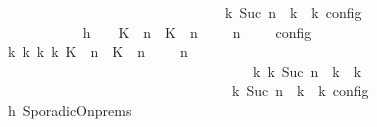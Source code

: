 \begin{isabellebody}
\ \ \ \ \ \ \ \ \ \ \ \ \ \ \ \ \ \ \ \ \ \ \ \ \ \ \ \ {\isasymand}\ {\isasymrho}\ {\isasymin}\ {\isasymlbrakk}\ {\isasymGamma}\isactrlsub k{\isacharcomma}\ Suc\ n\ {\isasymturnstile}\ {\isasymPsi}\isactrlsub k\ {\isasymtriangleright}\ {\isasymPhi}\isactrlsub k\ {\isasymrbrakk}\isactrlsub c\isactrlsub o\isactrlsub n\isactrlsub f\isactrlsub i\isactrlsub g{\isacartoucheclose}\isanewline
\ \ \ \ \ \ \ \ \isamarkupfalse%
\ {\isacharminus}\isanewline
\ \ \ \ \ \ \ \ \ \ \isamarkupfalse%
\ h{}{\isacharcolon}\ {\isacartoucheopen}{\isasymrho}\ {\isasymin}\ {\isasymlbrakk}\ {\isacharparenleft}{\isacharparenleft}K\ {\isasymUp}\ n{\isacharparenright}\ {\isacharhash}\ {\isacharparenleft}K\ {\isasymDown}\ n\ {\isacharat}\ {\isasymtau}{\isacharparenright}\ {\isacharhash}\ {\isasymGamma}{\isacharparenright}{\isacharcomma}\ n\ {\isasymturnstile}\ {\isasymPsi}\ {\isasymtriangleright}\ {\isasymPhi}\ {\isasymrbrakk}\isactrlsub c\isactrlsub o\isactrlsub n\isactrlsub f\isactrlsub i\isactrlsub g{\isacartoucheclose}\isanewline
\ \ \ \ \ \ \ \ \ \ \isamarkupfalse%
\ {\isacartoucheopen}{\isasymexists}{\isasymGamma}\isactrlsub k\ {\isasymPsi}\isactrlsub k\ {\isasymPhi}\isactrlsub k\ k{\isachardot}\ {\isacharparenleft}{\isacharparenleft}{\isacharparenleft}{\isacharparenleft}K\ {\isasymUp}\ n{\isacharparenright}\ {\isacharhash}\ {\isacharparenleft}K\ {\isasymDown}\ n\ {\isacharat}\ {\isasymtau}{\isacharparenright}\ {\isacharhash}\ {\isasymGamma}{\isacharparenright}{\isacharcomma}\ n\ {\isasymturnstile}\ {\isasymPsi}\ {\isasymtriangleright}\ {\isasymPhi}{\isacharparenright}\isanewline
\ \ \ \ \ \ \ \ \ \ \ \ \ \ \ \ \ \ \ \ \ \ \ \ \ \ \ \ \ \ \ \ \ \ \ \ {\isasymhookrightarrow}\isactrlbsup k\isactrlesup \ {\isacharparenleft}{\isasymGamma}\isactrlsub k{\isacharcomma}\ Suc\ n\ {\isasymturnstile}\ {\isasymPsi}\isactrlsub k\ {\isasymtriangleright}\ {\isasymPhi}\isactrlsub k{\isacharparenright}{\isacharparenright}\isanewline
\ \ \ \ \ \ \ \ \ \ \ \ \ \ \ \ \ \ \ \ \ \ \ \ \ \ \ \ \ {\isasymand}\ {\isasymrho}\ {\isasymin}\ {\isasymlbrakk}\ {\isasymGamma}\isactrlsub k{\isacharcomma}\ Suc\ n\ {\isasymturnstile}\ {\isasymPsi}\isactrlsub k\ {\isasymtriangleright}\ {\isasymPhi}\isactrlsub k\ {\isasymrbrakk}\isactrlsub c\isactrlsub o\isactrlsub n\isactrlsub f\isactrlsub i\isactrlsub g{\isacartoucheclose}\isanewline
\ \ \ \ \ \ \ \ \ \ \ \ \isamarkupfalse%
\ h{}\ SporadicOn{\isachardot}prems\ \isamarkupfalse%

\end{isabellebody}
